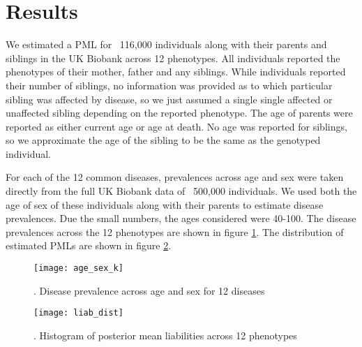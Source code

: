 \documentclass{article}
\begin{document}
\section{Results}
We estimated a PML for ~116,000 individuals along with their parents and siblings in the UK Biobank across 12 phenotypes. All individuals reported the phenotypes of their mother, father and any siblings. While individuals reported their number of siblings, no information was provided as to which particular sibling was affected by disease, so we just assumed a single single affected or unaffected sibling depending on the reported phenotype. The age of parents were reported as either current age or age at death. No age was reported for siblings, so we approximate the age of the sibling to be the same as the genotyped individual.

For each of the 12 common diseases, prevalences across age and sex were taken directly from the full UK Biobank data of ~500,000 individuals. We used both the age of sex of these individuals along with their parents to estimate disease prevalences. Due the small numbers, the ages considered were 40-100. The disease prevalences across the 12 phenotypes are shown in figure \ref{disease_k}. The distribution of estimated PMLs are shown in figure \ref{pml_dist}.

\begin{figure}
  \texttt{[image: age\_sex\_k]}
  \caption{. Disease prevalence across age and sex for 12 diseases}
  \label{disease_k}
\end{figure}

\begin{figure}
  \texttt{[image: liab\_dist]}
  \caption{. Histogram of posterior mean liabilities across 12 phenotypes}
  \label{pml_dist}
\end{figure}
\end{document}
